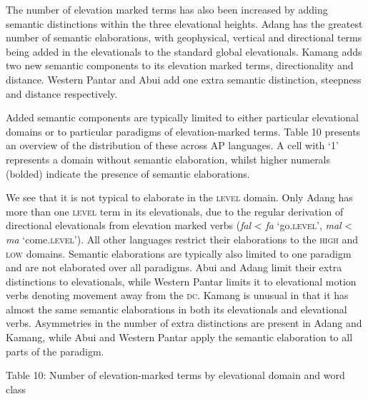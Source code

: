 The number of elevation marked terms has also been increased by adding semantic distinctions within the three elevational heights. Adang has the greatest number of semantic elaborations, with geophysical, vertical and directional terms being added in the elevationals to the standard global elevationals. Kamang adds two new semantic components to its elevation marked terms, directionality and distance. Western Pantar and Abui add one extra semantic distinction, steepness and distance respectively. 

Added semantic components are typically limited to either particular elevational domains or to particular paradigms of elevation-marked terms. Table 10 presents an overview of the distribution of these across AP languages. A cell with {\textquoteleft}1{\textquoteright} represents a domain without semantic elaboration, whilst higher numerals (bolded) indicate the presence of semantic elaborations. 

We see that it is not typical to elaborate in the \textsc{level} domain. Only Adang has more than one \textsc{level} term in its elevationals, due to the regular derivation of directional elevationals from elevation marked verbs (\textit{fal}\textit{{\textepsilon}} {\textless} \textit{fa }{\textquoteleft}go\textsc{.level{\textquoteright}, }\textit{mal}\textit{{\textepsilon} }{\textless}\textit{ ma} {\textquoteleft}come\textsc{.level{\textquoteright}}). All other languages restrict their elaborations to the \textsc{high} and \textsc{low }domains. Semantic elaborations are typically also limited to one paradigm and are not elaborated over all paradigms. Abui and Adang limit their extra distinctions to elevationals, while Western Pantar limits it to elevational motion verbs denoting movement away from the \textsc{dc}. Kamang is unusual in that it has almost the same semantic elaborations in both its elevationals and elevational verbs. Asymmetries in the number of extra distinctions are present in Adang and 
Kamang, while Abui and Western Pantar apply the semantic elaboration to all parts of the paradigm.

{\centering
Table 10: Number of elevation-marked terms by elevational domain and word class 
\par}

